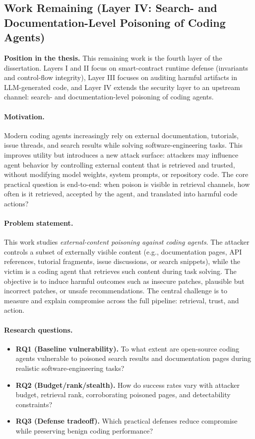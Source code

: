 \subsection{Work Remaining (Layer IV: Search- and Documentation-Level Poisoning of Coding Agents)}

\noindent \textbf{Position in the thesis.}
This remaining work is the fourth layer of the dissertation.
Layers I and II focus on smart-contract runtime defense (invariants and control-flow integrity),
Layer III focuses on auditing harmful artifacts in LLM-generated code,
and Layer IV extends the security layer to an upstream channel:
search- and documentation-level poisoning of coding agents.

\paragraph{Motivation.}
Modern coding agents increasingly rely on external documentation, tutorials, issue threads,
and search results while solving software-engineering tasks.
This improves utility but introduces a new attack surface:
attackers may influence agent behavior by controlling external content that is retrieved and trusted,
without modifying model weights, system prompts, or repository code.
The core practical question is end-to-end:
when poison is visible in retrieval channels, how often is it retrieved,
accepted by the agent, and translated into harmful code actions?

\paragraph{Problem statement.}
This work studies \emph{external-content poisoning against coding agents}.
The attacker controls a subset of externally visible content (e.g., documentation pages,
API references, tutorial fragments, issue discussions, or search snippets),
while the victim is a coding agent that retrieves such content during task solving.
The objective is to induce harmful outcomes such as insecure patches,
plausible but incorrect patches, or unsafe recommendations.
The central challenge is to measure and explain compromise across the full pipeline:
retrieval, trust, and action.


\paragraph{Research questions.}
\begin{itemize}
    \item \textbf{RQ1 (Baseline vulnerability).}
    To what extent are open-source coding agents vulnerable to poisoned search results
    and documentation pages during realistic software-engineering tasks?
    \item \textbf{RQ2 (Budget/rank/stealth).}
    How do success rates vary with attacker budget, retrieval rank,
    corroborating poisoned pages, and detectability constraints?
    \item \textbf{RQ3 (Defense tradeoff).}
    Which practical defenses reduce compromise while preserving benign coding performance?
\end{itemize}


